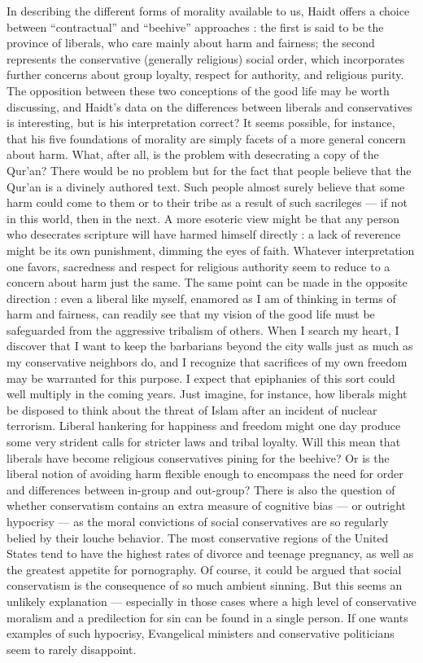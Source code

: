 \documentclass[a4paper,14pt]{extarticle}
\begin{document}
In describing the different forms of morality available to us, Haidt offers a choice between ``contractual'' and ``beehive'' approaches :
the first is said to be the province of liberals, who care mainly about harm and fairness;
the second represents the conservative (generally religious) social order, which incorporates further concerns about group loyalty, respect for authority, and religious purity.
The opposition between these two conceptions of the good life may be worth discussing, and Haidt's data on the differences between liberals and conservatives is interesting, but is his interpretation correct?
It seems possible, for instance, that his five foundations of morality are simply facets of a more general concern about harm.
What, after all, is the problem with desecrating a copy of the Qur'an?
There would be no problem but for the fact that people believe that the Qur'an is a divinely authored text.
Such people almost surely believe that some harm could come to them or to their tribe as a result of such sacrileges --- if not in this world, then in the next.
A more esoteric view might be that any person who desecrates scripture will have harmed himself directly :
a lack of reverence might be its own punishment, dimming the eyes of faith.
Whatever interpretation one favors, sacredness and respect for religious authority seem to reduce to a concern about harm just the same.
The same point can be made in the opposite direction :
even a liberal like myself, enamored as I am of thinking in terms of harm and fairness, can readily see that my vision of the good life must be safeguarded from the aggressive tribalism of others.
When I search my heart, I discover that I want to keep the barbarians beyond the city walls just as much as my conservative neighbors do, and I recognize that sacrifices of my own freedom may be warranted for this purpose.
I expect that epiphanies of this sort could well multiply in the coming years.
Just imagine, for instance, how liberals might be disposed to think about the threat of Islam after an incident of nuclear terrorism.
Liberal hankering for happiness and freedom might one day produce some very strident calls for stricter laws and tribal loyalty.
Will this mean that liberals have become religious conservatives pining for the beehive?
Or is the liberal notion of avoiding harm flexible enough to encompass the need for order and differences between in-group and out-group?
There is also the question of whether conservatism contains an extra measure of cognitive bias --- or outright hypocrisy --- as the moral convictions of social conservatives are so regularly belied by their louche behavior.
The most conservative regions of the United States tend to have the highest rates of divorce and teenage pregnancy, as well as the greatest appetite for pornography.
Of course, it could be argued that social conservatism is the consequence of so much ambient sinning.
But this seems an unlikely explanation --- especially in those cases where a high level of conservative moralism and a predilection for sin can be found in a single person.
If one wants examples of such hypocrisy, Evangelical ministers and conservative politicians seem to rarely disappoint.
\end{document}
